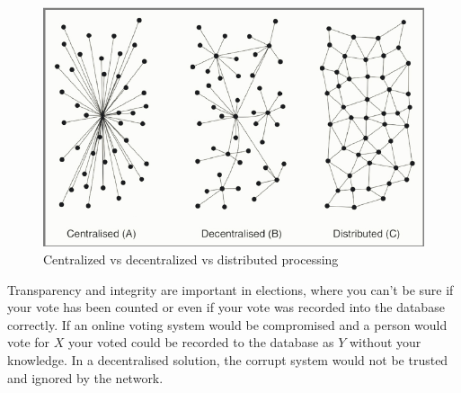 \begin{figure}[H]
    \begin{center}
        \begin{minipage}{\linewidth}
            \begin{center}
                \includegraphics[width=\textwidth,keepaspectratio]{img/centralized-vs-decentralized-vs-distributed-processing.png}
                \caption{Centralized vs decentralized vs distributed processing \cite{cen_dec_dis}}
                \label{obr 1.2.1}
            \end{center}
        \end{minipage}
    \end{center}
\end{figure}

Transparency and integrity are important in elections, where you can't be sure if your vote has been counted or even if your vote was recorded into the database correctly. If an online voting system would be compromised and a person would vote for $X$ your voted could be recorded to the database as $Y$ without your knowledge. In a decentralised solution, the corrupt system would not be trusted and ignored by the network.

